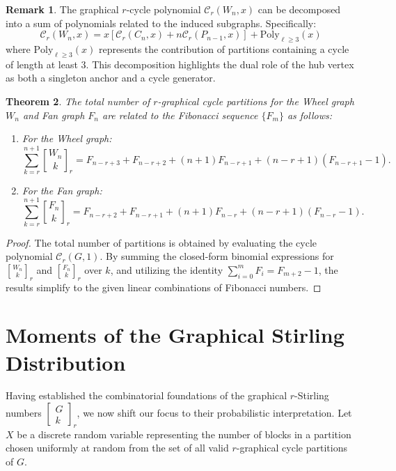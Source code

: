 \documentclass{amsart}
\newtheorem{theorem}{Theorem}[section]
\theoremstyle{definition}
\newtheorem{remark}[theorem]{Remark}
\def\st#1#2{\begin{bmatrix} #1 \\ #2 \end{bmatrix}}
\begin{document}
\begin{remark}
The graphical $r$-cycle polynomial $\mathcal{C}_r(W_n, x)$ can be decomposed into a sum of polynomials related to the induced subgraphs. Specifically:
\begin{equation*}
    \mathcal{C}_r(W_n, x) = x \left[ \mathcal{C}_r(C_n, x) + n \mathcal{C}_r(P_{n-1}, x) \right] + \text{Poly}_{\ell \geq 3}(x)
\end{equation*}
where $\text{Poly}_{\ell \geq 3}(x)$ represents the contribution of partitions containing a cycle of length at least $3$. This decomposition highlights the dual role of the hub vertex as both a singleton anchor and a cycle generator.
\end{remark}
\begin{theorem}
The total number of $r$-graphical cycle partitions for the Wheel graph $W_n$ and Fan graph $F_n$ are related to the Fibonacci sequence $\{F_m\}$ as follows:
\begin{enumerate}
    \item For the Wheel graph:
    \begin{equation*}
        \sum_{k=r}^{n+1} {W_n \brack k}_r = F_{n-r+3} + F_{n-r+2} + (n+1)F_{n-r+1} + (n-r+1)(F_{n-r+1} - 1).
    \end{equation*}
    \item For the Fan graph:
    \begin{equation*}
        \sum_{k=r}^{n+1} {F_n \brack k}_r = F_{n-r+2} + F_{n-r+1} + (n+1)F_{n-r} + (n-r+1)(F_{n-r} - 1).
    \end{equation*}
\end{enumerate}
\end{theorem}

\begin{proof}
The total number of partitions is obtained by evaluating the cycle polynomial $\mathcal{C}_r(G, 1)$. By summing the closed-form binomial expressions for ${W_n \brack k}_r$ and ${F_n \brack k}_r$ over $k$, and utilizing the identity $\sum_{i=0}^m F_i = F_{m+2} - 1$, the results simplify to the given linear combinations of Fibonacci numbers.
\end{proof}
\section{Moments of the Graphical Stirling Distribution}

Having established the combinatorial foundations of the graphical $r$-Stirling numbers $\st{G}{k}_r$, we now shift our focus to their probabilistic interpretation. Let $X$ be a discrete random variable representing the number of blocks in a partition chosen uniformly at random from the set of all valid $r$-graphical cycle partitions of $G$.
\end{document}
